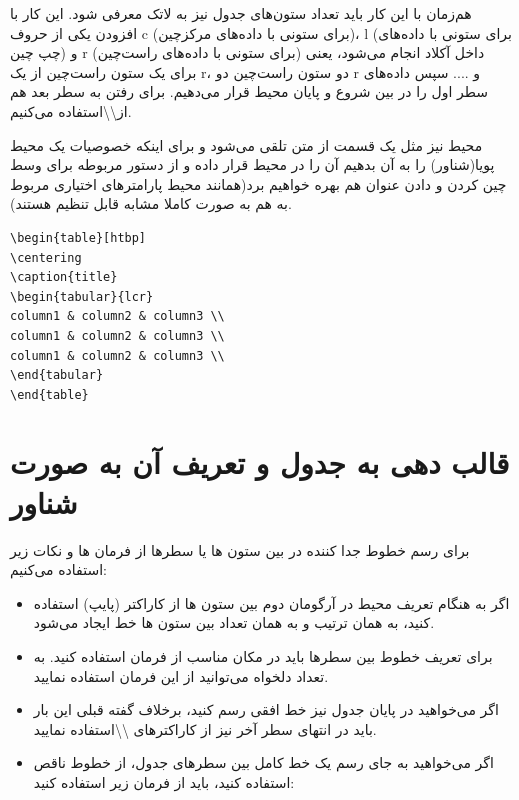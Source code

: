 هم‌زمان با این کار باید تعداد ستون‌های جدول نیز به لاتک معرفی شود. این کار با افزودن یکی از حروف c (برای ستونی با داده‌های مرکزچین)، l (برای ستونی با داده‌های چپ چین) و r (برای ستونی با داده‌های راست‌چین) داخل آکلاد انجام می‌شود، یعنی برای یک ستون راست‌چین از یک r، دو ستون راست‌چین دو r و .... سپس داده‌های سطر اول را در بین شروع و پایان محیط  قرار می‌دهیم. برای رفتن به سطر بعد هم از\textbackslash\textbackslash استفاده می‌کنیم.

محیط  نیز مثل یک قسمت از متن تلقی می‌شود و برای اینکه خصوصیات یک محیط پویا(شناور) را به آن بدهیم آن را در محیط  قرار داده و از دستور مربوطه برای وسط چین کردن و دادن عنوان هم بهره خواهیم برد(همانند محیط  پارامترهای اختیاری مربوط به  هم به صورت کاملا مشابه قابل تنظیم هستند).

\begin{latin}
\begin{lstlisting}[style=Tex]
\begin{table}[htbp]
\centering
\caption{title}
\begin{tabular}{lcr}
column1 & column2 & column3 \\
column1 & column2 & column3 \\
column1 & column2 & column3 \\
\end{tabular}
\end{table}
\end{lstlisting}
\end{latin}
\section{قالب دهی به جدول و تعریف آن به صورت شناور}

برای رسم خطوط جدا کننده در بین ستون ها یا سطرها از فرمان ها و نکات زیر استفاده می‌کنیم:
\begin{itemize}
\item  اگر به هنگام تعریف محیط  در آرگومان دوم بین ستون ها از کاراکتر \textbar (پایپ) استفاده کنید، به همان ترتیب و به همان تعداد بین ستون ها خط ایجاد می‌شود.
\item برای تعریف خطوط بین سطرها باید در مکان مناسب از فرمان  استفاده کنید. به تعداد دلخواه می‌توانید از این فرمان استفاده نمایید.
\item اگر می‌خواهید در پایان جدول نیز خط افقی رسم کنید، برخلاف گفته قبلی این بار باید در انتهای سطر آخر نیز از کاراکترهای \textbackslash\textbackslash استفاده نمایید.
\item  اگر می‌خواهید به جای رسم یک خط کامل بین سطرهای جدول، از خطوط ناقص استفاده کنید، باید از فرمان زیر استفاده کنید:
\end{itemize}

